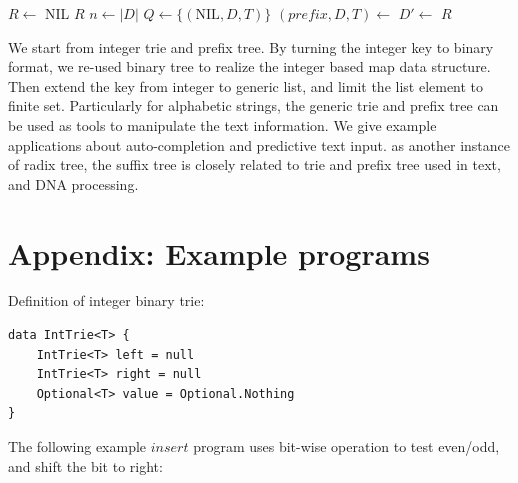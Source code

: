 \documentclass[b5paper]{article}
\begin{document}
\begin{algorithmic}[1]
  \State $R \gets $ NIL
    \State \Return $R$
  \EndIf
  \State $n \gets |D|$
  \State $Q \gets \{(\text{NIL}, D, T)\}$
    \State $(\textit{prefix}, D, T) \gets$ 
      \State $D' \gets$ 
       
        \State {} 
        \State {}
      \EndIf
    \EndFor
  \EndWhile
  \State \Return $R$
\EndFunction
\end{algorithmic}

We start from integer trie and prefix tree. By turning the integer key to binary format, we re-used binary tree to realize the integer based map data structure. Then extend the key from integer to generic list, and limit the list element to finite set. Particularly for alphabetic strings, the generic trie and prefix tree can be used as tools to manipulate the text information. We give example applications about auto-completion and predictive text input. as another instance of radix tree, the suffix tree is closely related to trie and prefix tree used in text, and DNA processing.

\begin{Exercise}
\end{Exercise}

\section{Appendix: Example programs}

Definition of integer binary trie:

\begin{lstlisting}[language = Bourbaki]
data IntTrie<T> {
    IntTrie<T> left = null
    IntTrie<T> right = null
    Optional<T> value = Optional.Nothing
}
\end{lstlisting}

The following example $insert$ program uses bit-wise operation to test even/odd, and shift the bit to right:
\end{document}
